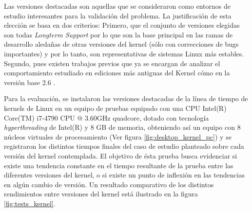\begin{center}
\end{center}

Las versiones destacadas son aquellas que se consideraron como entornos de estudio interesantes para la validación del problema. La justificación de esta elección se basa en dos criterios: Primero, que el conjunto de versiones elegidas son todas \emph{Longterm Support} por lo que son la base principal en las ramas de desarrollo aledañas de otras versiones del kernel (sólo con correcciones de bugs importantes) y por lo tanto, son representativas de sistemas Linux más estables. Segundo, pues existen trabajos previos que ya se encargan de analizar el comportamiento estudiado en ediciones más antiguas del Kernel cómo en la versión base 2.6 \cite{tesis:diegoDCC}.

Para la evaluación, se instalaron las versiones destacadas de la línea de tiempo de kernels de Linux en un equipo de pruebas equipado con una CPU Intel(R) Core(TM) i7-4790 CPU @ 3.60GHz quadcore, dotado con tecnología \emph{hyperthreading} de Intel(R) y 8 GB de memoria, obteniendo así un equipo con 8 núcleos virtuales de procesamiento (Ver figura \ref{fig:desktop_kernel_pc}) y se registraron los distintos tiempos finales del caso de estudio planteado sobre cada versión del kernel contemplada. El objetivo de ésta prueba busca evidenciar si existe una tendencia constante en el tiempo resultante de la prueba entre las diferentes versiones del kernel, o si existe un punto de inflexión en las tendencias en algún cambio de versión. Un resultado comparativo de los distintos rendimientos entre versiones del kernel está ilustrado en la figura \ref{fig:tests_kernel}.

